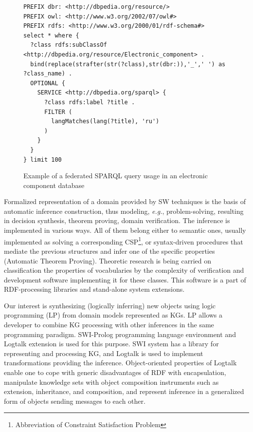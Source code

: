 \documentclass[
]{ceurart}
\begin{document}
\begin{figure}[bth]
  \centering
\begin{verbatim}
PREFIX dbr: <http://dbpedia.org/resource/>
PREFIX owl: <http://www.w3.org/2002/07/owl#>
PREFIX rdfs: <http://www.w3.org/2000/01/rdf-schema#>
select * where {
  ?class rdfs:subClassOf <http://dbpedia.org/resource/Electronic_component> .
  bind(replace(strafter(str(?class),str(dbr:)),'_',' ') as ?class_name) .
  OPTIONAL {
    SERVICE <http://dbpedia.org/sparql> {
      ?class rdfs:label ?title .
      FILTER (
        langMatches(lang(?title), 'ru')
      )
    }
  }
} limit 100
\end{verbatim}
  \caption{Example of a federated SPARQL query usage in an electronic component database}
  \label{fig:sparql-ex1}
\end{figure}

Formalized representation of a domain provided by SW techniques is the basis of automatic inference construction, thus modeling, \emph{e.g.}, problem-solving, resulting in decision synthesis, theorem proving, domain verification. The inference is implemented in various ways. All of them belong either to semantic ones, usually implemented as solving a corresponding CSP\footnote{Abbreviation of Constraint Satisfaction Problem}, or syntax-driven procedures that mediate the previous structures and infer one of the specific properties (Automatic Theorem Proving). Theoretic research is being carried on classification the properties of vocabularies by the complexity of verification and development software implementing it for these classes. This software is a  part of RDF-processing libraries and stand-alone system extensions.

Our interest is synthesizing (logically inferring) new objects using logic programming (LP) from domain models represented as KGs. LP allows a developer to combine KG processing with other inferences in the same programming paradigm. SWI-Prolog programming language environment and Logtalk extension is used for this purpose. SWI system has a library for representing and processing KG, and Logtalk is used to implement transformations providing the inference. Object-oriented properties of Logtalk enable one to cope with generic disadvantages of RDF with encapsulation, manipulate knowledge sets with object composition instruments such as extension, inheritance, and composition, and represent inference in a generalized form of objects sending messages to each other.
\end{document}
